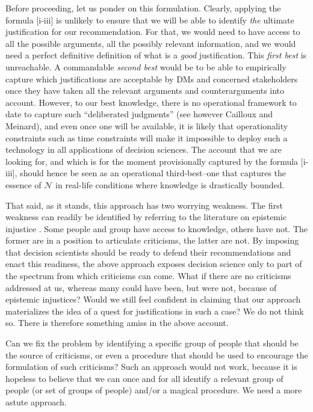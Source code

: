 \documentclass[preprint, french, english, 11pt, authoryear]{elsarticle}%
\newcommand{\adv}{\mathscr{N}}
\begin{document}
Before proceeding, let us ponder on this formulation. Clearly, applying the formula [i-iii] is unlikely to ensure that we will be able to identify \emph{the} ultimate justification for our recommendation. For that, we would need to have access to all the possible arguments, all the possibly relevant information, and we would need a perfect definitive definition of what is a \emph{good} justification. This \emph{first best} is unreachable. A commandable \emph{second best} would be to be able to empirically capture which justifications are acceptable by \acp{DM} and concerned stakeholders once they have taken all the relevant arguments and counterarguments into account. However, to our best knowledge, there is no operational framework to date to capture such ``deliberated judgments'' (see however Cailloux and Meinard), and even once one will be available, it is likely that operationality constraints such as time constraints will make it impossible to deploy such a technology in all applications of decision sciences. The account that we are looking for, and which is for the moment provisionally captured by the formula [i-iii], should hence be seen as an operational third-best--one that captures the essence of $\adv$ in real-life conditions where knowledge is drastically bounded.

That said, as it stands, this approach has two worrying weakness.
The first weakness can readily be identified by referring to the literature on epistemic injustice \cite{fricker_epistemic_2007}. Some people and group have access to knowledge, others have not. The former are in a position to articulate criticisms, the latter are not. By imposing that decision scientists should be ready to defend their recommendations and enact this readiness, the above approach exposes decision science only to part of the spectrum from which criticisms can come. What if there are no criticisms addressed at us, whereas many could have been, but were not, because of epistemic injustices? 
Would we still feel confident in claiming that our approach materializes the idea of a quest for justifications in such a case? We do not think so. There is therefore something amiss in the above account.

Can we fix the problem by identifying a specific group of people that should be the source of criticisms, or even a procedure that should be used to encourage the formulation of such criticisms? Such an approach would not work, because it is hopeless to believe that we can once and for all identify a relevant group of people (or set of groups of people) and/or a magical procedure. We need a more astute approach.
\end{document}
